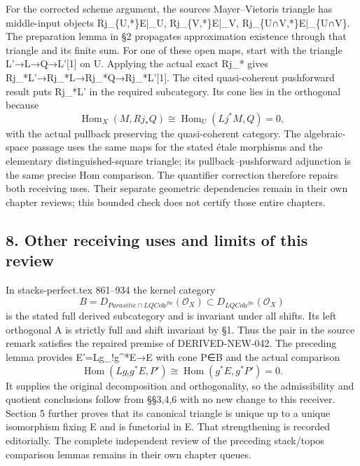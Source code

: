 \documentclass[11pt]{article}
\begin{document}
For the corrected scheme argument,\allowbreak{} the source\textquotesingle s Mayer–\allowbreak{}Vietoris triangle has middle-input objects Rj\_\allowbreak{}\{U,\allowbreak{}*\}E|\_\allowbreak{}U,\allowbreak{} Rj\_\allowbreak{}\{V,\allowbreak{}*\}E|\_\allowbreak{}V,\allowbreak{} Rj\_\allowbreak{}\{U∩V,\allowbreak{}*\}E|\_\allowbreak{}\{U∩V\}. The preparation lemma in §2 propagates approximation existence through that triangle and its finite sum. For one of these open maps,\allowbreak{} start with the triangle L'\allowbreak{}→L\allowbreak{}→Q\allowbreak{}→L'[1]\allowbreak{} on U. Applying the actual exact Rj\_\allowbreak{}* gives Rj\_\allowbreak{}*L'\allowbreak{}→Rj\_\allowbreak{}*L\allowbreak{}→Rj\_\allowbreak{}*Q\allowbreak{}→Rj\_\allowbreak{}*L'[1]\allowbreak{}. The cited quasi-coherent pushforward result puts Rj\_\allowbreak{}*L' in the required subcategory. Its cone lies in the orthogonal because \[
 \operatorname{Hom}_X(M,Rj_*Q)
   \cong\operatorname{Hom}_U(Lj^*M,Q)=0,
\] with the actual pullback preserving the quasi-coherent category. The algebraic-space passage uses the same maps for the stated étale morphisms and the elementary distinguished-square triangle; its pullback–\allowbreak{}pushforward adjunction is the same precise Hom comparison. The quantifier correction therefore repairs both receiving uses. Their separate geometric dependencies remain in their own chapter reviews; this bounded check does not certify those entire chapters.

\subsection{8. Other receiving uses and limits of this review}\label{proofs-11665-12003-other-receiving-uses-and-limits-of-this-review}

In stacks-perfect.tex 861–\allowbreak{}934 the kernel category \[
 B=D_{\textit{Parasitic}\cap\textit{LQCoh}^{fbc}}(\mathcal O_X)
 \subset D_{\textit{LQCoh}^{fbc}}(\mathcal O_X)
\] is the stated full derived subcategory and is invariant under all shifts. Its left orthogonal A is strictly full and shift invariant by §1. Thus the pair in the source remark satisfies the repaired premise of DERIVED-NEW-042. The preceding lemma provides E'\allowbreak{}=Lg\_\allowbreak{}!g\textasciicircum{}*E\allowbreak{}→E with cone P\allowbreak{}∈B and the actual comparison \[
 \operatorname{Hom}(Lg_!g^*E,P')
  \cong\operatorname{Hom}(g^*E,g^*P')=0.
\] It supplies the original decomposition and orthogonality,\allowbreak{} so the admissibility and quotient conclusions follow from §§3,\allowbreak{}4,\allowbreak{}6 with no new change to this receiver. Section 5 further proves that its canonical triangle is unique up to a unique isomorphism fixing E and is functorial in E. That strengthening is recorded editorially. The complete independent review of the preceding stack/\allowbreak{}topos comparison lemmas remains in their own chapter queues.
\end{document}
